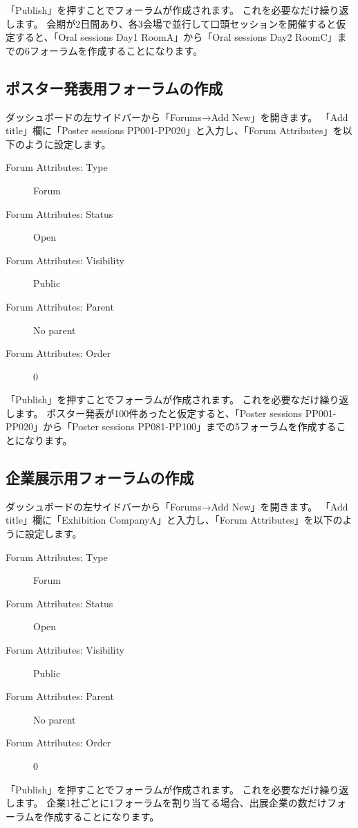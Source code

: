 \documentclass[titlepage,10pt,a4paper,uplatex]{jsbook}
\begin{document}
「Publish」を押すことでフォーラムが作成されます。
これを必要なだけ繰り返します。
会期が2日間あり、各3会場で並行して口頭セッションを開催すると仮定すると、「Oral sessions Day1 RoomA」から「Oral sessions Day2 RoomC」までの6フォーラムを作成することになります。

\subsection{ポスター発表用フォーラムの作成}

ダッシュボードの左サイドバーから「Forums→Add New」を開きます。
「Add title」欄に「Poster sessions PP001-PP020」と入力し、「Forum Attributes」を以下のように設定します。

\begin{description}
\item[Forum Attributes: Type] Forum
\item[Forum Attributes: Status] Open
\item[Forum Attributes: Visibility] Public
\item[Forum Attributes: Parent] No parent
\item[Forum Attributes: Order] 0
\end{description}

「Publish」を押すことでフォーラムが作成されます。
これを必要なだけ繰り返します。
ポスター発表が100件あったと仮定すると、「Poster sessions PP001-PP020」から「Poster sessions PP081-PP100」までの5フォーラムを作成することになります。

\subsection{企業展示用フォーラムの作成}

ダッシュボードの左サイドバーから「Forums→Add New」を開きます。
「Add title」欄に「Exhibition CompanyA」と入力し、「Forum Attributes」を以下のように設定します。

\begin{description}
\item[Forum Attributes: Type] Forum
\item[Forum Attributes: Status] Open
\item[Forum Attributes: Visibility] Public
\item[Forum Attributes: Parent] No parent
\item[Forum Attributes: Order] 0
\end{description}

「Publish」を押すことでフォーラムが作成されます。
これを必要なだけ繰り返します。
企業1社ごとに1フォーラムを割り当てる場合、出展企業の数だけフォーラムを作成することになります。
\end{document}
